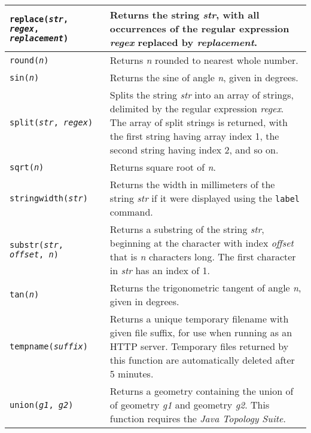 \begin{longtable}{|p{5cm}|p{7cm}|}
\hline

\texttt{replace(\textit{str}, \textit{regex}, \textit{replacement})} &
Returns the string \textit{str}, with all occurrences of the regular
expression \textit{regex} replaced by \textit{replacement}. \\

\hline

\texttt{round(\textit{n})} &
Returns \textit{n} rounded to nearest whole number. \\

\hline

\texttt{sin(\textit{n})} &
Returns the sine of angle \textit{n}, given in degrees. \\

\hline

\texttt{split(\textit{str}, \textit{regex})} &
Splits the string \textit{str} into an array of strings, delimited by the
regular expression \textit{regex}.
The array of split strings is returned,
with the first string having array index 1, the
second string having index 2, and so on. \\

\hline

\texttt{sqrt(\textit{n})} &
Returns square root of \textit{n}. \\

\hline

\texttt{stringwidth(\textit{str})} &
Returns the width in millimeters of the string \textit{str}
if it were displayed using the \texttt{label} command.  \\

\hline

\texttt{substr(\textit{str}, \textit{offset}, \textit{n})} &
Returns a substring of the string \textit{str}, beginning at the
character with index \textit{offset} that is \textit{n} characters long.
The first character in \textit{str} has an index of 1. \\

\hline

\texttt{tan(\textit{n})} &
Returns the trigonometric tangent of angle \textit{n}, given in degrees. \\

\hline

\texttt{tempname(\textit{suffix})} &
Returns a unique temporary filename with given file suffix,
for use when running as an HTTP server.
Temporary files returned by this function
are automatically deleted after 5 minutes. \\

\hline

\texttt{union(\textit{g1}, \textit{g2})} &
Returns a geometry containing the union of 
of geometry \textit{g1} and geometry \textit{g2}.
This function requires the \textit{Java Topology Suite}. \\

\hline
\end{longtable}

